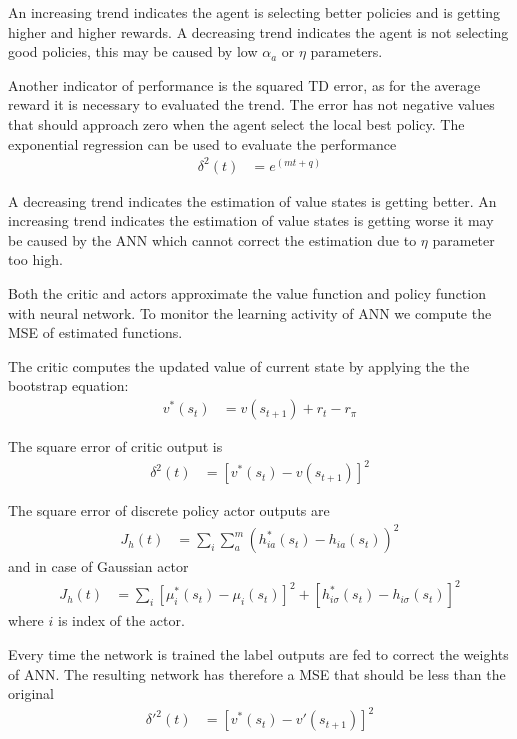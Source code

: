 \documentclass[]{article}
\begin{document}
An increasing trend indicates the agent is selecting better policies and is getting higher and higher rewards.
A decreasing trend indicates the agent is not selecting good policies, this may be caused by low $ \alpha_a $ or $ \eta $ parameters.

Another indicator of performance is the squared TD error, as for the average reward it is necessary to evaluated the trend.
The error has not negative values that should approach zero when the agent select the local best policy. The exponential regression can be used to evaluate the performance
\begin{align}
	\delta^2(t) & = e^{(mt + q)}
\end{align}

A decreasing trend indicates the estimation of value states is getting better.
An increasing trend indicates the estimation of value states is getting worse it may be caused by the ANN which cannot correct the estimation due to $ \eta $ parameter too high.

Both the critic and actors approximate the value function and policy function with neural network.
To monitor the learning activity of ANN we compute the MSE of estimated functions.

The critic computes the updated value of current state by applying the the bootstrap equation:
\begin{align*}
	v^*(s_t)&	= v(s_{t+1}) + r_t - r_\pi 
\end{align*}

The square error of critic output is
\begin{align*}
	\delta^2(t)&	= [v^*(s_t) - v(s_{t+1})]^2
\end{align*}

The square error of discrete policy actor outputs are
\begin{align*}
	J_h(t)&	= \sum_i \sum_a^m (h_{ia}^*(s_t) - h_{ia}(s_t))^2
\end{align*}
and in case of Gaussian actor
\begin{align*}
	J_h(t)&	= \sum_i [\mu_i^*(s_t) - \mu_i(s_t)]^2 + [h_{i\sigma}^*(s_t) - h_{i\sigma}(s_t)]^2
\end{align*}
where $ i $ is index of the actor.

Every time the network is trained the label outputs are fed to correct the weights of ANN.
The resulting network has therefore a MSE that should be less than the original
\begin{align*}
	\delta'^2(t)&	= [v^*(s_t) - v'(s_{t+1})]^2
\end{align*}
\end{document}
